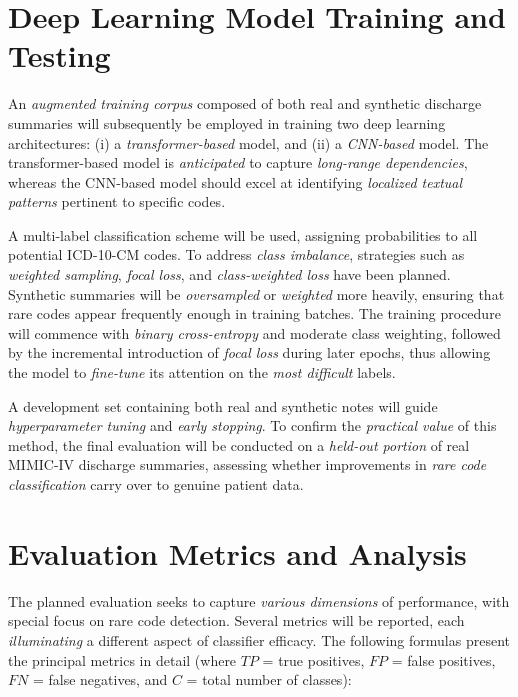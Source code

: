 \section{Deep Learning Model Training and Testing}
An \emph{augmented training corpus} composed of both real and synthetic discharge summaries will subsequently be employed in training two deep learning architectures: (i) a \emph{transformer-based} model, and (ii) a \emph{CNN-based} model. The transformer-based model is \emph{anticipated} to capture \emph{long-range dependencies}, whereas the CNN-based model should excel at identifying \emph{localized textual patterns} pertinent to specific codes.

A multi-label classification scheme will be used, assigning probabilities to all potential ICD-10-CM codes. To address \emph{class imbalance}, strategies such as \emph{weighted sampling}, \emph{focal loss}, and \emph{class-weighted loss} have been planned. Synthetic summaries will be \emph{oversampled} or \emph{weighted} more heavily, ensuring that rare codes appear frequently enough in training batches. The training procedure will commence with \emph{binary cross-entropy} and moderate class weighting, followed by the incremental introduction of \emph{focal loss} during later epochs, thus allowing the model to \emph{fine-tune} its attention on the \emph{most difficult} labels.

A development set containing both real and synthetic notes will guide \emph{hyperparameter tuning} and \emph{early stopping}. To confirm the \emph{practical value} of this method, the final evaluation will be conducted on a \emph{held-out portion} of real MIMIC-IV discharge summaries, assessing whether improvements in \emph{rare code classification} carry over to genuine patient data.

\section{Evaluation Metrics and Analysis}
The planned evaluation seeks to capture \emph{various dimensions} of performance, with special focus on rare code detection. Several metrics will be reported, each \emph{illuminating} a different aspect of classifier efficacy. The following formulas present the principal metrics in detail (where $TP$ = true positives, $FP$ = false positives, $FN$ = false negatives, and $C$ = total number of classes):

